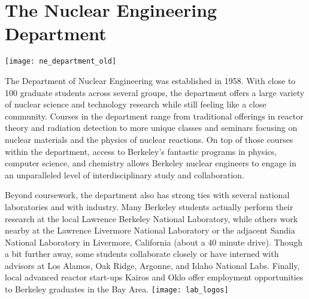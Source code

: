 
\section*{The Nuclear Engineering Department}
\begin{center}
  \texttt{[image: ne\_department\_old]}
\end{center}

\vspace{0.25cm}
The Department of Nuclear Engineering was established in 1958. 
With close to 100 graduate students across several groups, the department offers a large variety of nuclear science and technology research while still feeling like a close community. 
Courses in the department range from traditional offerings in reactor theory and radiation detection to more unique classes and seminars focusing on nuclear materials and the physics of nuclear reactions. 
On top of those courses within the department, access to Berkeley's fantastic programs in physics, computer science, and chemistry allows Berkeley nuclear engineers to engage in an unparalleled level of interdisciplinary study and collaboration.

Beyond coursework, the department also has strong ties with several national laboratories and with industry.
Many Berkeley students actually perform their research at the local Lawrence Berkeley National Laboratory, while others work nearby at the Lawrence Livermore National Laboratory or the adjacent Sandia National Laboratory in Livermore, California (about a 40 minute drive). 
Though a bit further away, some students collaborate closely or have interned with advisors at Los Alamos, Oak Ridge, Argonne, and Idaho National Labs.
Finally, local advanced reactor start-ups Kairos and Oklo offer employment opportunities to Berkeley graduates in the Bay Area.
\vfill
\texttt{[image: lab\_logos]}
